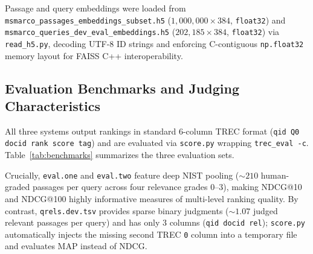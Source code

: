 \documentclass[11pt]{article}
\begin{document}
Passage and query embeddings were loaded from \texttt{msmarco\_passages\_embeddings\_subset.h5} ($1{,}000{,}000 \times 384$, \texttt{float32}) and \texttt{msmarco\_queries\_dev\_eval\_embeddings.h5} ($202{,}185 \times 384$, \texttt{float32}) via \texttt{read\_h5.py}, decoding UTF-8 ID strings and enforcing C-contiguous \texttt{np.float32} memory layout for FAISS C++ interoperability.

\subsection{Evaluation Benchmarks and Judging Characteristics}
All three systems output rankings in standard 6-column TREC format (\texttt{qid Q0 docid rank score tag}) and are evaluated via \texttt{score.py} wrapping \texttt{trec\_eval -c}. Table~\ref{tab:benchmarks} summarizes the three evaluation sets.

\begin{table}[H]
\centering
{}
\caption{Summary of query evaluation sets and relevance judgment characteristics.}
\label{tab:benchmarks}
\end{table}


Crucially, \texttt{eval.one} and \texttt{eval.two} feature deep NIST pooling ($\sim 210$ human-graded passages per query across four relevance grades $0$--$3$), making NDCG@10 and NDCG@100 highly informative measures of multi-level ranking quality. By contrast, \texttt{qrels.dev.tsv} provides sparse binary judgments ($\sim 1.07$ judged relevant passages per query) and has only 3 columns (\texttt{qid docid rel}); \texttt{score.py} automatically injects the missing second TREC \texttt{0} column into a temporary file and evaluates MAP instead of NDCG.
\end{document}
